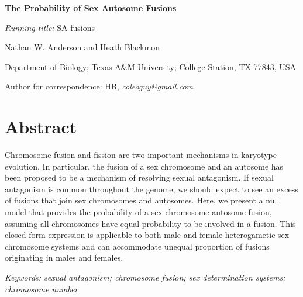 \documentclass[12pt]{article}
\begin{document}


\begin{center}
\textbf{The Probability of Sex Autosome Fusions}
\end{center}

\vfill
\noindent
\textit{Running title:} SA-fusions

\vfill
\noindent
Nathan W. Anderson and Heath Blackmon

\noindent
Department of Biology; Texas A\&M University; College Station, TX 77843, USA

\vfill



\noindent
Author for correspondence: HB, \textit{coleoguy@gmail.com}
\vfill

\clearpage

\section{Abstract}

Chromosome fusion and fission are two important mechanisms in karyotype evolution. 
In particular, the fusion of a sex chromosome and an autosome has been proposed to be a mechanism of resolving sexual antagonism.
If sexual antagonism is common throughout the genome, we should expect to see an excess of fusions that join sex chromosomes and autosomes.
Here, we present a null model that provides the probability of a sex chromosome autosome fusion, assuming all chromosomes have equal probability to be involved in a fusion.
This closed form expression is applicable to both male and female heterogametic sex chromosome systems and can accommodate unequal proportion of fusions originating in males and females.


\bigskip
\noindent
\textit{Keywords: sexual antagonism; chromosome fusion; sex determination systems; chromosome number}





\linenumbers
\end{document}
